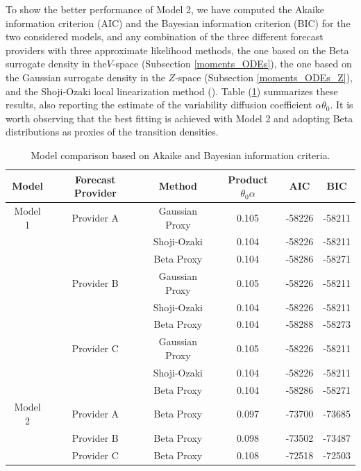 \documentclass[11pt]{article}
\theoremstyle{definition}
\begin{document}
To show the better performance of Model 2, we have computed the Akaike information criterion (AIC) and the Bayesian information criterion (BIC) for the two considered models, and any combination of the three different forecast providers with  {\color{black} three approximate likelihood methods, the one based on the Beta surrogate density in the$V$-space (Subsection \ref{moments_ODEs}), the one based on the Gaussian surrogate density in the $Z$-space (Subsection \ref{moments_ODEs_Z}), and the Shoji-Ozaki local linearization method (\cite{shoz}).} 
Table (\ref{tab:model_comparison}) summarizes these results, also reporting the estimate of the variability diffusion coefficient $\alpha \theta_0$. 
It is worth observing that the best fitting is achieved with Model 2 and adopting Beta distributions as proxies of the transition densities.

\begin{table}[H]
\centering
\begin{tabular}{cccccc}
\toprule
Model & Forecast Provider & Method & Product $\theta_0\alpha$   & AIC & BIC \\ \midrule
Model 1 & Provider A & Gaussian Proxy & 0.105 & -58226 & -58211 \\
 &  & Shoji-Ozaki & 0.104 & -58226 & -58211 \\
 &  & Beta Proxy & 0.104 & -58286 & -58271 \\
 & Provider B & Gaussian Proxy & 0.105 & -58226   & -58211 \\
 &  & Shoji-Ozaki & 0.104 & -58226 & -58211 \\
 &  & Beta Proxy & 0.104 & -58288 & -58273 \\
 & Provider C & Gaussian Proxy & 0.105 & -58226 & -58211 \\
 &  & Shoji-Ozaki & 0.104 & -58226 & -58211 \\
 &  & Beta Proxy & 0.104 & -58286 & -58271 \\
Model 2 & Provider A & Beta Proxy & 0.097 & -73700   & -73685 \\ 
 & Provider B & Beta Proxy & 0.098 &  -73502 & -73487 \\ 
 & Provider C & Beta Proxy & 0.108 & -72518 & -72503 \\ 
\bottomrule
\end{tabular}
\caption{Model comparison based on Akaike and Bayesian information criteria.}
\label{tab:model_comparison}
\end{table}
\end{document}
